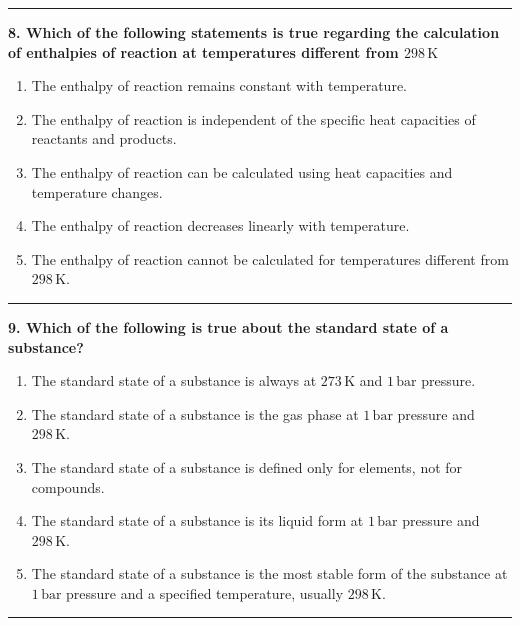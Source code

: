 \documentclass[
  9pt,
]{extbook}
\providecommand{\tightlist}{%
  \setlength{\itemsep}{0pt}\setlength{\parskip}{0pt}}
\theoremstyle{definition}
\theoremstyle{definition}
\theoremstyle{definition}
\theoremstyle{remark}
\begin{document}
\begin{center}\rule{0.5\linewidth}{0.5pt}\end{center}

\textbf{8. Which of the following statements is true regarding the calculation of enthalpies of reaction at temperatures different from \(298\,\text{K}\)}

\begin{enumerate}
\def\labelenumi{\alph{enumi}.}
\tightlist
\item
  The enthalpy of reaction remains constant with temperature.
\item
  The enthalpy of reaction is independent of the specific heat capacities of reactants and products.
\item
  The enthalpy of reaction can be calculated using heat capacities and temperature changes.
\item
  The enthalpy of reaction decreases linearly with temperature.
\item
  The enthalpy of reaction cannot be calculated for temperatures different from \(298\,\text{K}\).
\end{enumerate}

\begin{center}\rule{0.5\linewidth}{0.5pt}\end{center}

\textbf{9. Which of the following is true about the standard state of a substance?}

\begin{enumerate}
\def\labelenumi{\alph{enumi}.}
\tightlist
\item
  The standard state of a substance is always at \(273\,\text{K}\) and \(1\,\text{bar}\) pressure.
\item
  The standard state of a substance is the gas phase at \(1\,\text{bar}\) pressure and \(298 \,\text{K}\).
\item
  The standard state of a substance is defined only for elements, not for compounds.
\item
  The standard state of a substance is its liquid form at \(1\,\text{bar}\) pressure and \(298\,\text{K}\).
\item
  The standard state of a substance is the most stable form of the substance at \(1\,\text{bar}\) pressure and a specified temperature, usually \(298 \,\text{K}\).
\end{enumerate}

\begin{center}\rule{0.5\linewidth}{0.5pt}\end{center}
\end{document}
